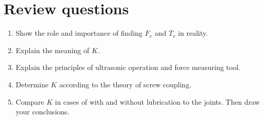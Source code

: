 \section{Review questions}
\begin{enumerate}
	\item Show the role and importance of finding $ F_v $ and $ T_v $ in reality.\\
	\item Explain the meaning of $ K $.\\
	\item Explain the principles of ultrasonic operation and force measuring tool.\\
	\item Determine $ K $ according to the theory of screw coupling.\\
	\item Compare $ K $ in cases of with and without lubrication to the joints. Then draw your conclusions.\\
\end{enumerate}